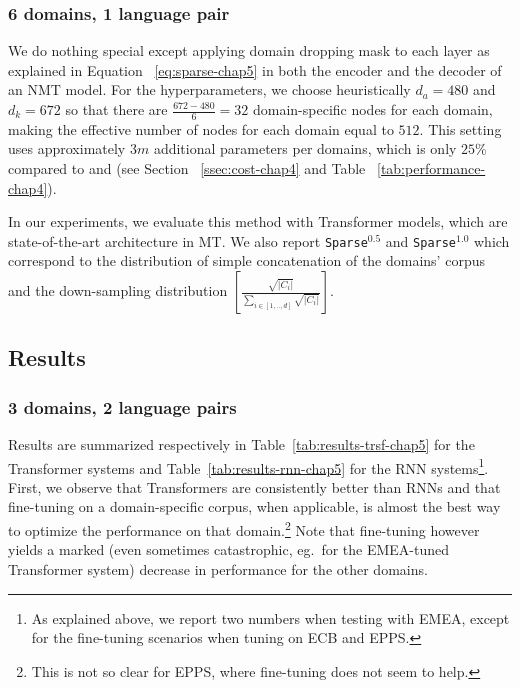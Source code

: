\subsubsection{6 domains, 1 language pair}
We do nothing special except applying domain dropping mask to each layer as explained in Equation ~\eqref{eq:sparse-chap5} in both the encoder and the decoder of an NMT model. For the hyperparameters, we choose heuristically $d_a = 480$ and $d_k = 672$ so that there are $\frac{672-480}{6} = 32$ domain-specific nodes for each domain, making the effective number of nodes for each domain equal to $512$. This setting uses approximately $3m$ additional parameters per domains, which is only $25\%$ compared to  and  (see Section ~\ref{ssec:cost-chap4} and Table ~\ref{tab:performance-chap4}).

In our experiments, we evaluate this method with Transformer models, which are state-of-the-art architecture in MT. We also report \texttt{Sparse}$^{0.5}$ and \texttt{Sparse}$^{1.0}$ which correspond to the distribution of simple concatenation of the domains' corpus and the down-sampling distribution $[\frac{\sqrt{|C_i|}}{\sum_{i\in [1,..,d]}\sqrt{|C_i|}}]$.

\subsection{Results \label{ssec:results-chap5}}
\subsubsection{3 domains, 2 language pairs}
\label{sssection:3domain-chap5}
Results are summarized respectively in Table~\ref{tab:results-trsf-chap5} for the Transformer systems and Table~\ref{tab:results-rnn-chap5} for the RNN systems\footnote{As explained above, we  report two numbers when testing with EMEA, except for the fine-tuning scenarios when tuning on ECB and EPPS.}. First, we observe that Transformers are consistently better than RNNs and that fine-tuning on a domain-specific corpus, when applicable, is almost the best way to optimize the performance on that domain.\footnote{This is not so clear for EPPS, where fine-tuning does not seem to help.}  
Note that fine-tuning however yields a marked (even sometimes catastrophic, eg.\ for the EMEA-tuned Transformer system) decrease in performance for the other domains. 

